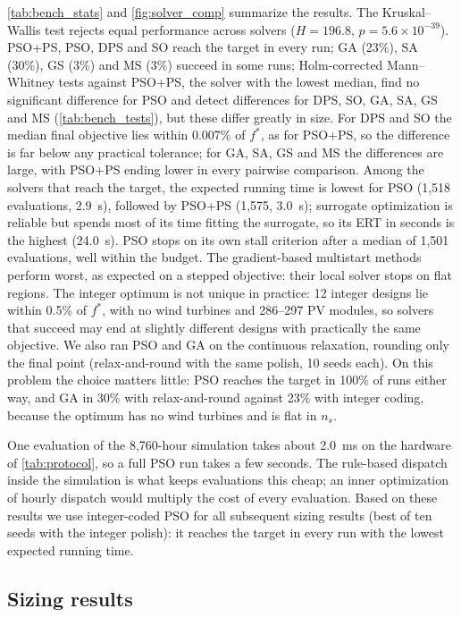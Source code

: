 \documentclass[final,3p,times]{elsarticle}
\begin{document}
\cref{tab:bench_stats} and \cref{fig:solver_comp} summarize the results. The Kruskal--Wallis test rejects equal performance across solvers ($H = 196.8$, $p = 5.6 \times 10^{-39}$). PSO+PS, PSO, DPS and SO reach the target in every run; GA (23\%), SA (30\%), GS (3\%) and MS (3\%) succeed in some runs;  Holm-corrected Mann--Whitney tests against PSO+PS, the solver with the lowest median, find no significant difference for PSO and detect differences for DPS, SO, GA, SA, GS and MS (\cref{tab:bench_tests}), but these differ greatly in size. For DPS and SO the median final objective lies within 0.007\% of $f^*$, as for PSO+PS, so the difference is far below any practical tolerance; for GA, SA, GS and MS the differences are large, with PSO+PS ending lower in every pairwise comparison. Among the solvers that reach the target, the expected running time is lowest for PSO (1,518 evaluations, 2.9~s), followed by PSO+PS (1,575, 3.0~s); surrogate optimization is reliable but spends most of its time fitting the surrogate, so its ERT in seconds is the highest (24.0~s). PSO stops on its own stall criterion after a median of 1,501 evaluations, well within the budget. The gradient-based multistart methods perform worst, as expected on a stepped objective: their local solver stops on flat regions. The integer optimum is not unique in practice: 12 integer designs lie within 0.5\% of $f^*$, with no wind turbines and 286--297 PV modules, so solvers that succeed may end at slightly different designs with practically the same objective. We also ran PSO and GA on the continuous relaxation, rounding only the final point (relax-and-round with the same polish, 10 seeds each). On this problem the choice matters little: PSO reaches the target in 100\% of runs either way, and GA in 30\% with relax-and-round against 23\% with integer coding, because the optimum has no wind turbines and is flat in $n_s$.

One evaluation of the 8,760-hour simulation takes about 2.0~ms on the hardware of \cref{tab:protocol}, so a full PSO run takes a few seconds. The rule-based dispatch inside the simulation is what keeps evaluations this cheap; an inner optimization of hourly dispatch would multiply the cost of every evaluation. Based on these results we use integer-coded PSO for all subsequent sizing results (best of ten seeds with the integer polish): it reaches the target in every run with the lowest expected running time.

\subsection{Sizing results}
\end{document}
